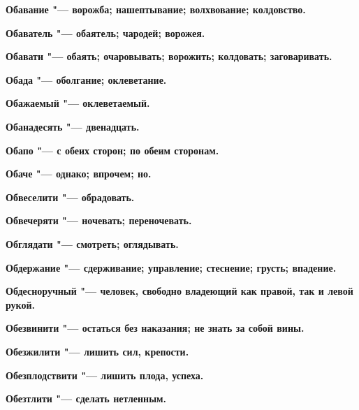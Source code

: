 \bfseries Обавание \normalfont{} "--- ворожба; нашептывание; волхвование; колдовство. 




\bfseries Обаватель \normalfont{} "--- обаятель; чародей; ворожея. 




\bfseries Обавати \normalfont{} "--- обаять; очаровывать; ворожить; колдовать; заговаривать. 




\bfseries Обада \normalfont{} "--- оболгание; оклеветание. 




\bfseries Обажаемый \normalfont{} "--- оклеветаемый. 




\bfseries Обанадесять \normalfont{} "--- двенадцать. 




\bfseries Обапо \normalfont{} "--- с обеих сторон; по обеим сторонам. 




\bfseries Обаче \normalfont{} "--- однако; впрочем; но. 




\bfseries Обвеселити \normalfont{} "--- обрадовать. 




\bfseries Обвечеряти \normalfont{} "--- ночевать; переночевать. 




\bfseries Обглядати \normalfont{} "--- смотреть; оглядывать. 




\bfseries Обдержание \normalfont{} "--- сдерживание; управление; стеснение; грусть; впадение. 




\bfseries Обдесноручный \normalfont{} "--- человек, свободно владеющий как правой, так и левой рукой. 




\bfseries Обезвинити \normalfont{} "--- остаться без наказания; не знать за собой вины. 




\bfseries Обезжилити \normalfont{} "--- лишить сил, крепости. 




\bfseries Обезплодствити \normalfont{} "--- лишить плода, успеха. 




\bfseries Обезтлити \normalfont{} "--- сделать нетленным. 




